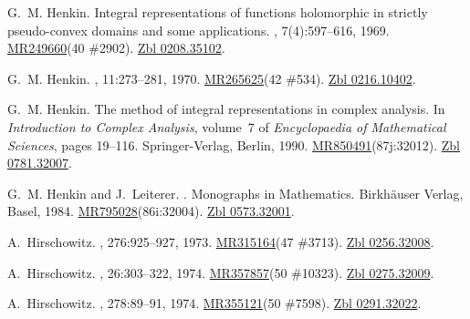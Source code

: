 \documentclass[11pt,a4paper, final, twoside]{article}
\numberwithin{equation}{section}
\begin{document}
\begin{appendices}
\begin{thebibliography}{100}
G.~M. Henkin.
\newblock Integral representations of functions holomorphic in strictly
  pseudo-convex domains and some applications.
, 7(4):597--616, 1969.
\newblock \href{http://www.ams.org/mathscinet-getitem?mr=249660}{MR249660}(40
  \#2902). \href{http://zbmath.org/?q=an:0208.35102}{Zbl 0208.35102}.

G.~M. Henkin.
, 11:273--281, 1970.
\newblock \href{http://www.ams.org/mathscinet-getitem?mr=265625}{MR265625}(42
  \#534). \href{http://zbmath.org/?q=an:0216.10402}{Zbl 0216.10402}.

G.~M. Henkin.
\newblock The method of integral representations in complex analysis.
\newblock In {\em Introduction to Complex Analysis}, volume~7 of {\em
  Encyclopaedia of Mathematical Sciences}, pages 19--116. Springer-Verlag,
  Berlin, 1990.
\newblock
  \href{http://www.ams.org/mathscinet-getitem?mr=850491}{MR850491}(87j:32012).
  \href{http://zbmath.org/?q=an:0781.32007}{Zbl 0781.32007}.

G.~M. Henkin and J.~Leiterer.
.
\newblock Monographs in Mathematics. Birkh{\"a}user Verlag, Basel, 1984.
\newblock
  \href{http://www.ams.org/mathscinet-getitem?mr=795028}{MR795028}(86i:32004).
  \href{http://zbmath.org/?q=an:0573.32001}{Zbl 0573.32001}.

A.~Hirschowitz.
, 276:925--927, 1973.
\newblock \href{http://www.ams.org/mathscinet-getitem?mr=315164}{MR315164}(47
  \#3713). \href{http://zbmath.org/?q=an:0256.32008}{Zbl 0256.32008}.

A.~Hirschowitz.
, 26:303--322, 1974.
\newblock \href{http://www.ams.org/mathscinet-getitem?mr=357857}{MR357857}(50
  \#10323). \href{http://zbmath.org/?q=an:0275.32009}{Zbl 0275.32009}.

A.~Hirschowitz.
, 278:89--91, 1974.
\newblock \href{http://www.ams.org/mathscinet-getitem?mr=355121}{MR355121}(50
  \#7598). \href{http://zbmath.org/?q=an:0291.32022}{Zbl 0291.32022}.


\end{thebibliography}
\end{appendices}
\end{document}
